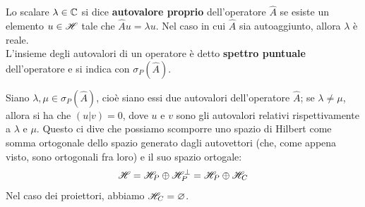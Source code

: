 \begin{definizione}
Lo scalare $\lambda \in \mathbb{C}$ si dice \textbf{autovalore proprio} dell'operatore $\hat{A}$ se esiste un elemento $u \in \mathscr{H}$ tale che $\hat{A} u = \lambda u$. Nel caso in cui $\hat{A}$ sia autoaggiunto, allora $\lambda$ è reale.\\
L'insieme degli  autovalori di un operatore è detto \textbf{spettro puntuale} dell'operatore e si indica con $\sigma_P (\hat{A})$.
\end{definizione}
Siano $\lambda , \mu \in \sigma_P (\hat{A})$, cioè siano essi due autovalori dell'operatore $\hat{A}$; se $\lambda \neq \mu$, allora si ha che $(u|v)=0$, dove $u$ e $v$ sono gli autovalori relativi rispettivamente a $\lambda$ e $\mu$. Questo ci dive che possiamo scomporre uno spazio di Hilbert come somma ortogonale  dello spazio generato dagli autovettori (che, come appena visto, sono ortogonali fra loro) e il suo spazio ortogale:
$$\mathscr{H}=\mathscr{H}_P \oplus \mathscr{H}_P ^{\perp}=\mathscr{H}_P \oplus \mathscr{H}_C$$
Nel caso dei proiettori, abbiamo $\mathscr{H}_C=\varnothing$.
